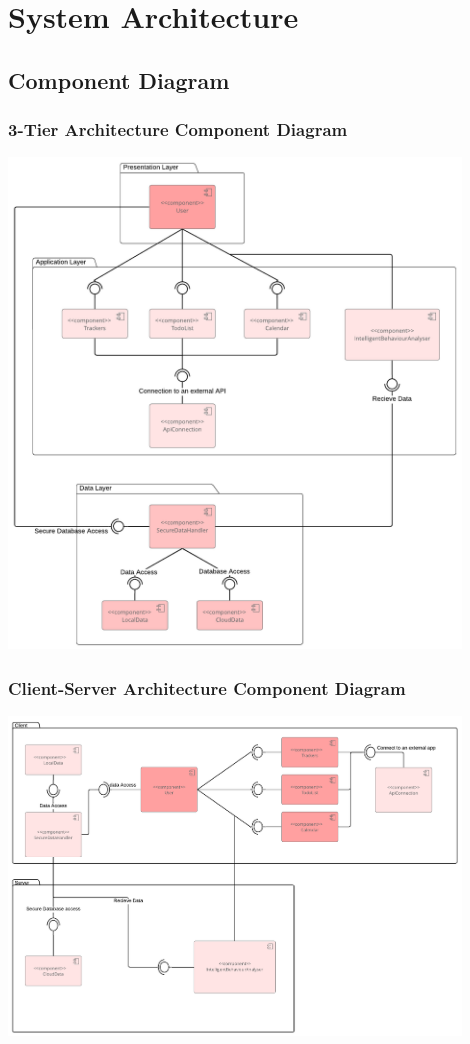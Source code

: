 \documentclass[a4paper,11pt]{article} %
\begin{document}
\section{System Architecture}
\subsection{Component Diagram}
\subsubsection{3-Tier Architecture Component Diagram}
\vspace{1cm}
\begin{center}
    \includegraphics[width=0.9\textwidth]{img/Component_Diagram_3tier.pdf}
\end{center}
\newpage
\subsubsection{Client-Server Architecture Component Diagram}
\begin{center}
    \includegraphics[width=0.9\textwidth]{img/Component_Diagram_SC.pdf}
\end{center}
\ 
\end{document}
